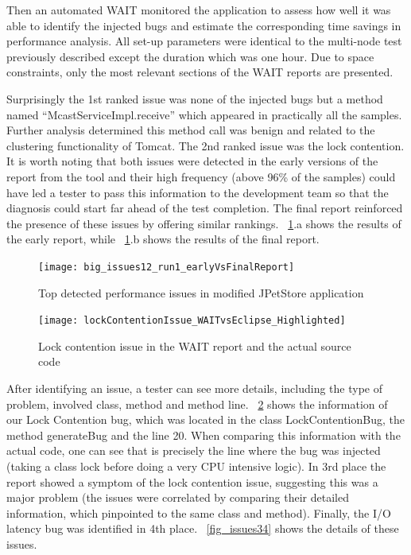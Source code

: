 \documentclass[runningheads,a4paper]{llncs}
\begin{document}
Then an automated WAIT monitored the application to assess how well
it was able to identify the injected bugs and estimate the corresponding time
savings in performance analysis. All set-up parameters were identical to
the multi-node test previously described except the duration which
was one hour. Due to space constraints, only the most relevant sections
of the WAIT reports are presented.

Surprisingly the 1st ranked issue was none of the injected bugs but a method
named ``McastServiceImpl.receive'' which appeared in practically all the
samples. Further analysis determined this method call was benign and related
to the clustering functionality of Tomcat. The 2nd ranked issue was the lock
contention. It is worth noting that both issues were
detected in the early versions of the report from the tool and their high
frequency (above 96\% of the samples) could have led a tester to pass this
information to the development team so that the diagnosis could start far ahead
of the test completion. The final report reinforced the presence of these issues 
by offering similar rankings. \figurename ~\ref{fig_run1_bugs12}.a shows the
results of the early report, while ~\ref{fig_run1_bugs12}.b shows the results of 
the final report.

\begin{figure}[!h]
\centering
\texttt{[image: big\_issues12\_run1\_earlyVsFinalReport]}
\caption{Top detected performance issues in modified JPetStore application}
\label{fig_run1_bugs12}
\end{figure}

\begin{figure}[!h]
\centering
\texttt{[image: lockContentionIssue\_WAITvsEclipse\_Highlighted]}
\caption{Lock contention issue in the WAIT report and the actual source code}
\label{fig_issue2_vs_code}
\end{figure}

After identifying an issue, a tester can see more details, including the type of
problem, involved class, method and method line. \figurename
~\ref{fig_issue2_vs_code} shows the information of our Lock Contention bug,
which was located in the class LockContentionBug, the method generateBug and the
line 20. When comparing this information with the actual code, one can see that
is precisely the line where the bug was injected (taking a class lock before
doing a very CPU intensive logic). In 3rd place the report showed a symptom of
the lock contention issue, suggesting this was a major problem (the issues were correlated 
by comparing their detailed information, which pinpointed to the same class and
method). Finally, the I/O latency bug was identified in 4th place. \figurename
~\ref{fig_issues34} shows the details of these issues.
\end{document}
